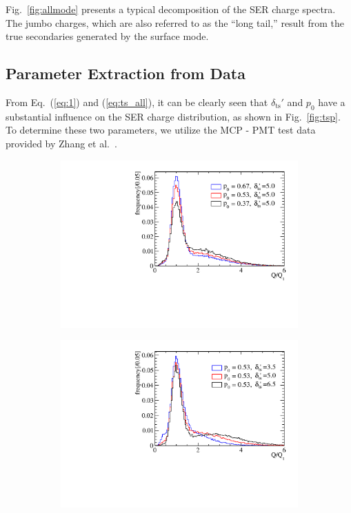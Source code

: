 Fig.~\ref{fig:allmode} presents a typical decomposition of the SER charge spectra. The jumbo charges, which are also referred to as the “long tail,” result from the true secondaries generated by the surface mode.

\subsection{Parameter Extraction from Data}\label{subsec:chitest}
From Eq.~(\ref{eq:1}) and (\ref{eq:ts_all}), it can be clearly seen that $\delta_{\mathrm{ts}}'$ and \(p_0\) have a substantial influence on the SER charge distribution, as shown in Fig.~\ref{fig:tsp}. To determine these two parameters, we utilize the MCP - PMT test data provided by Zhang et al.~\cite{Zhang:2023ued}.
\begin{figure}[!htbp]
	\centering
	\begin{subfigure}{0.47\textwidth}
		\centering
		\includegraphics[width=\linewidth]{PMTRelated/GTmodel/p.pdf}
		\caption{}
		\label{fig:p}
	\end{subfigure}
	\hfill
	\begin{subfigure}{0.47\textwidth}
		\centering
		\includegraphics[width=\linewidth]{PMTRelated/GTmodel/ts.pdf}

\end{subfigure}
\end{figure}

